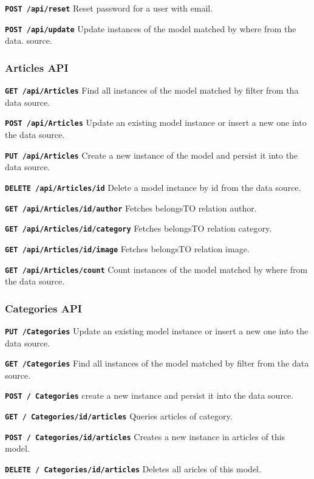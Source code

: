 \texttt{\textbf{POST /api/reset}} Reset password for a user with email.

\texttt{\textbf{POST /api/update}} Update instances of the model matched by where from the data. source.

	
\subsubsection{Articles API}

\texttt{\textbf{GET /api/Articles}} Find all instances of the model matched by filter from tha data source.

\texttt{\textbf{POST /api/Articles}} Update an existing model instance or insert a new one into the data source.

\texttt{\textbf{PUT /api/Articles}} Create a new instance of the model and persist it into the data source.

\texttt{\textbf{DELETE /api/Articles/{id}}} Delete a model instance by id from the data source.

\texttt{\textbf{GET /api/Articles/{id}/author}} Fetches belongsTO relation author.

\texttt{\textbf{GET /api/Articles/{id}/category}} Fetches belongsTO relation category.

\texttt{\textbf{GET /api/Articles/{id}/image}} Fetches belongsTO relation image.

\texttt{\textbf{GET /api/Articles/count}} Count instances of the model matched by where from the data source.


\subsubsection{Categories API}

\texttt{\textbf{PUT /Categories}} Update an existing model instance or insert a new one into the data source.

\texttt{\textbf{GET /Categories}} Find all instances of the model matched by filter from the data source.

\texttt{\textbf{POST / Categories}} create a new instance and persist it into the data source.

\texttt{\textbf{GET / Categories/{id}/articles}} Queries articles of category.

\texttt{\textbf{POST / Categories/{id}/articles}} Creates a new instance in articles of this model.

\texttt{\textbf{DELETE / Categories/{id}/articles}} Deletes all aricles of this model.


